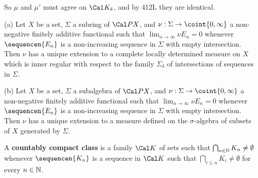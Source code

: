 {

\noindent So $\mu$ and $\mu'$ must agree on $\Cal K_{\delta}$, and by
412L they are identical.
}%

 (a) Let $X$ be a set, $\Sigma$ a subring of
$\Cal PX$, and $\nu:\Sigma\to\coint{0,\infty}$
a non-negative finitely additive functional such
that $\lim_{n\to\infty}\nu E_n=0$ whenever $\sequencen{E_n}$ is a
non-increasing sequence in $\Sigma$ with empty intersection.   Then
$\nu$ has a unique extension to a complete locally determined measure on
$X$ which is inner regular with respect to the family $\Sigma_{\delta}$
of intersections of sequences in $\Sigma$.

(b) Let $X$ be a set, $\Sigma$ a subalgebra of $\Cal PX$, and
$\nu:\Sigma\to\coint{0,\infty}$ a non-negative finitely additive functional such
that $\lim_{n\to\infty}\nu E_n=0$ whenever $\sequencen{E_n}$ is a
non-increasing sequence in $\Sigma$ with empty intersection.   Then
$\nu$ has a unique extension to a measure defined on the
$\sigma$-algebra of subsets of $X$ generated by $\Sigma$.



 A {\bf countably compact class} is a family
$\Cal K$ of sets such that $\bigcap_{n\in\Bbb N}K_n\ne\emptyset$
whenever $\sequencen{K_n}$ is a sequence in $\Cal K$ such that
$\bigcap_{i\le n}K_i\ne\emptyset$ for every $n\in\Bbb N$.

